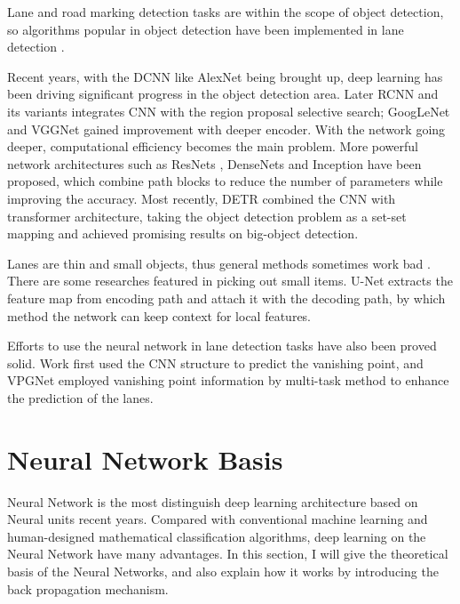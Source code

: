\begin{spacing}{1.5}
Lane and road marking detection tasks are within the scope of object detection, so algorithms popular in object detection have been implemented in lane detection \cite{tang2020review}. 

Recent years, with the DCNN like AlexNet \cite{krizhevsky2012imagenet} being brought up, deep learning has been driving significant progress in the object detection area. Later RCNN and its variants \cite{girshick2014rich, girshick2015fast, ren2015faster} integrates CNN with the region proposal selective search; GoogLeNet \cite{szegedy2015going} and VGGNet \cite{simonyan2014very} gained improvement with deeper encoder. With the network going deeper, computational efficiency becomes the main problem. More powerful network architectures such as ResNets \cite{he2016deep}, DenseNets \cite{huang2017densely} and Inception \cite{ioffe2015batch} have been proposed, which combine path blocks to reduce the number of parameters while improving the accuracy. Most recently, DETR \cite{carion2020end} combined the CNN with transformer architecture, taking the object detection problem as a set-set mapping and achieved promising results on big-object detection.

Lanes are thin and small objects, thus general methods sometimes work bad \cite{tang2020review}. There are some researches featured in picking out small items. U-Net \cite{ronneberger2015unet} extracts the feature map from encoding path and attach it with the decoding path, by which method the network can keep context for local features.

Efforts to use the neural network in lane detection tasks have also been proved solid. Work \cite{borji2016vanishing} first used the CNN structure to predict the vanishing point, and VPGNet \cite{lee2017vpgnet} employed vanishing point information by multi-task method to enhance the prediction of the lanes.

\section{Neural Network Basis}

Neural Network is the most distinguish deep learning architecture based on Neural units recent years. Compared with conventional machine learning and human-designed mathematical classification algorithms, deep learning on the Neural Network have many advantages. In this section, I will give the theoretical basis of the Neural Networks, and also explain how it works by introducing the back propagation mechanism.


\end{spacing}
